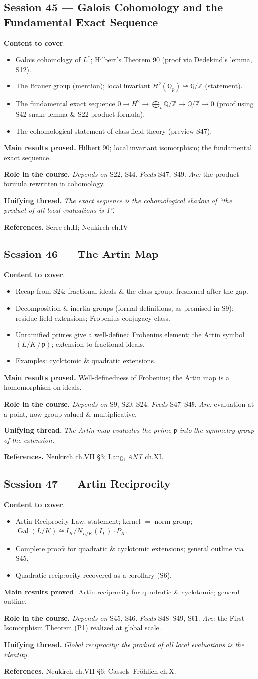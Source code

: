 \documentclass[11pt,a4paper]{article}
\newcommand{\sess}[2]{\subsection[#1. #2]{Session #1 --- #2}}
\newcommand{\chead}{\par\smallskip\noindent\textbf{Content to cover.}}
\newcommand{\proved}[1]{\par\smallskip\noindent\textbf{Main results proved.} #1}
\newcommand{\role}[1]{\par\smallskip\noindent\textbf{Role in the course.} #1}
\newcommand{\thread}[1]{\par\smallskip\noindent\textbf{Unifying thread.} \textit{#1}}
\newcommand{\srefs}[1]{\par\smallskip\noindent\textbf{References.} #1}
\newcommand{\Z}{\mathbb{Z}}
\newcommand{\Q}{\mathbb{Q}}
\newcommand{\Gal}{\operatorname{Gal}}
\newcommand{\p}{\mathfrak{p}}
\begin{document}
	\sess{45}{Galois Cohomology and the Fundamental Exact Sequence}
	\chead
	\begin{itemize}
		\item Galois cohomology of $L^*$; Hilbert's Theorem 90 (proof via Dedekind's lemma, S12).
		\item The Brauer group (mention); local invariant $H^2(\Q_p)\cong\Q/\Z$ (statement).
		\item The fundamental exact sequence $0\to H^2\to\bigoplus_v\Q/\Z\to\Q/\Z\to0$ (proof using S42 snake lemma \& S22 product formula).
		\item The cohomological statement of class field theory (preview S47).
	\end{itemize}
	\proved{Hilbert 90; local invariant isomorphism; the fundamental exact sequence.}
	\role{\emph{Depends on} S22, S44. \emph{Feeds} S47, S49. \emph{Arc:} the product formula rewritten in cohomology.}
	\thread{The exact sequence is the cohomological shadow of ``the product of all local evaluations is 1''.}
	\srefs{Serre ch.II; Neukirch ch.IV.}
	
	\sess{46}{The Artin Map}
	\chead
	\begin{itemize}
		\item Recap from S24: fractional ideals \& the class group, freshened after the gap.
		\item Decomposition \& inertia groups (formal definitions, as promised in S9); residue field extensions; Frobenius conjugacy class.
		\item Unramified primes give a well-defined Frobenius element; the Artin symbol $(L/K\,/\,\p)$; extension to fractional ideals.
		\item Examples: cyclotomic \& quadratic extensions.
	\end{itemize}
	\proved{Well-definedness of Frobenius; the Artin map is a homomorphism on ideals.}
	\role{\emph{Depends on} S9, S20, S24. \emph{Feeds} S47--S49. \emph{Arc:} evaluation at a point, now group-valued \& multiplicative.}
	\thread{The Artin map evaluates the prime $\p$ into the symmetry group of the extension.}
	\srefs{Neukirch ch.VII \S3; Lang, \emph{ANT} ch.XI.}
	
	\sess{47}{Artin Reciprocity}
	\chead
	\begin{itemize}
		\item Artin Reciprocity Law: statement; kernel $=$ norm group; $\Gal(L/K)\cong I_K/N_{L/K}(I_L)\cdot P_K$.
		\item Complete proofs for quadratic \& cyclotomic extensions; general outline via S45.
		\item Quadratic reciprocity recovered as a corollary (S6).
	\end{itemize}
	\proved{Artin reciprocity for quadratic \& cyclotomic; general outline.}
	\role{\emph{Depends on} S45, S46. \emph{Feeds} S48--S49, S61. \emph{Arc:} the First Isomorphism Theorem (P1) realized at global scale.}
	\thread{Global reciprocity: the product of all local evaluations is the identity.}
	\srefs{Neukirch ch.VII \S6; Cassels--Fr\"ohlich ch.X.}
	
\end{document}
